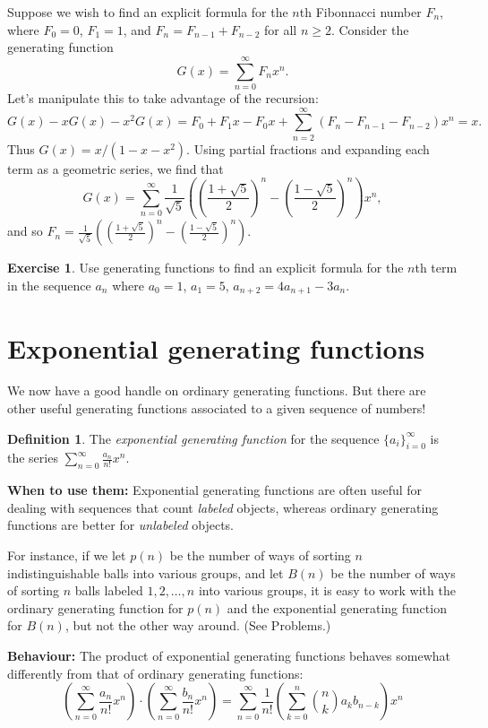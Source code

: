 \documentclass[11pt]{article}
\theoremstyle{definition}
\newtheorem*{exercise}{Exercise}
\newtheorem*{definition}{Definition}
\begin{document}
Suppose we wish to find an explicit formula for the $n$th Fibonnacci number $F_n$, where $F_0=0$, $F_1=1$, and $F_{n}=F_{n-1}+F_{n-2}$ for all $n\ge 2$.  Consider the generating function $$G(x)=\sum_{n=0}^\infty F_n x^n.$$  Let's manipulate this to take advantage of the recursion:
$$ G(x)-xG(x)-x^2G(x) = F_0+F_1x-F_0x+\sum_{n=2}^\infty (F_n-F_{n-1}-F_{n-2}) x^n =x.$$
Thus $G(x)=x/(1-x-x^2)$.  Using partial fractions and expanding each term as a geometric series, we find that $$G(x)=\sum_{n=0}^\infty \frac{1}{\sqrt{5}}\left(\left(\frac{1+\sqrt{5}}{2}\right)^n-\left(\frac{1-\sqrt{5}}{2}\right)^n\right)x^n,$$ and so $F_n=\frac{1}{\sqrt{5}}\left(\left(\frac{1+\sqrt{5}}{2}\right)^n-\left(\frac{1-\sqrt{5}}{2}\right)^n\right)$.

\begin{exercise}
  Use generating functions to find an explicit formula for the $n$th term in the sequence $a_n$ where $a_0 = 1$, $a_1 = 5$, $a_{n+2} = 4a_{n+1} -3a_n$.
\end{exercise}

\section*{Exponential generating functions}

We now have a good handle on ordinary generating functions.  But there are other useful generating functions associated to a given sequence of numbers!

\begin{definition} The \textit{exponential generating function} for the sequence $\{a_i\}_{i=0}^\infty$ is the series $\sum_{n=0}^\infty \frac{a_n}{n!}x^n$.  \end{definition}

\textbf{When to use them:}  Exponential generating functions are often useful for dealing with sequences that count \textit{labeled} objects, whereas ordinary generating functions are better for \textit{unlabeled} objects.  

For instance, if we let $p(n)$ be the number of ways of sorting $n$ indistinguishable balls into various groups, and let $B(n)$ be the number of ways of sorting $n$ balls labeled $1,2,\ldots,n$ into various groups, it is easy to work with the ordinary generating function for $p(n)$ and the exponential generating function for $B(n)$, but not the other way around. (See Problems.)

\textbf{Behaviour:}  The product of exponential generating functions behaves somewhat differently from that of ordinary generating functions:
$$\left(\sum_{n=0}^\infty \frac{a_n}{n!}x^n\right)\cdot \left(\sum_{n=0}^\infty \frac{b_n}{n!}x^n\right)=\sum_{n=0}^\infty \frac{1}{n!}\left(\sum_{k=0}^n\binom{n}{k}a_k b_{n-k}\right)x^n$$
\end{document}
